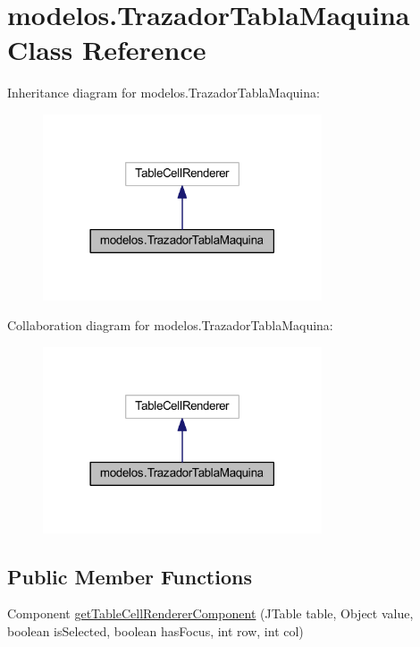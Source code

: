 \hypertarget{classmodelos_1_1_trazador_tabla_maquina}{}\section{modelos.\+Trazador\+Tabla\+Maquina Class Reference}
\label{classmodelos_1_1_trazador_tabla_maquina}


Inheritance diagram for modelos.\+Trazador\+Tabla\+Maquina\+:
\nopagebreak
\begin{figure}[H]
\begin{center}
\leavevmode
\includegraphics[width=234pt]{classmodelos_1_1_trazador_tabla_maquina__inherit__graph}
\end{center}
\end{figure}


Collaboration diagram for modelos.\+Trazador\+Tabla\+Maquina\+:
\nopagebreak
\begin{figure}[H]
\begin{center}
\leavevmode
\includegraphics[width=234pt]{classmodelos_1_1_trazador_tabla_maquina__coll__graph}
\end{center}
\end{figure}
\subsection*{Public Member Functions}
\begin{DoxyCompactItemize}
\item 
Component \mbox{\hyperlink{classmodelos_1_1_trazador_tabla_maquina_a2ea391f01832f424c6e212bd8ff86484}{get\+Table\+Cell\+Renderer\+Component}} (J\+Table table, Object value, boolean is\+Selected, boolean has\+Focus, int row, int col)
\end{DoxyCompactItemize}


